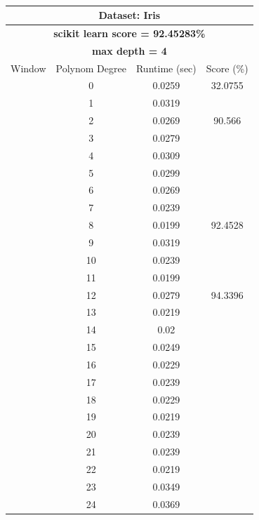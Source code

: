 \documentclass{article}
\begin{document}
\begin{multicols}{2}
\begin{table}[H]
\caption{}
\label{tab:my-table}
\begin{tabular}{|c|c|c|c|}
\hline
\multicolumn{4}{|c|}{\textbf{Dataset: Iris}} \\ \hline
\multicolumn{4}{|c|}{\textbf{scikit learn score = 92.45283\%}} \\ \hline
\multicolumn{4}{|c|}{\textbf{max depth = 4}} \\ \hline
Window & Polynom Degree & Runtime (sec) & Score (\%) \\ \hline
 & 0 & 0.0259 & 32.0755 \\ \cline{2-4} 
 & 1 & 0.0319 &  \\ \cline{2-3}
 & 2 & 0.0269 & \multirow{-2}{*}{90.566} \\ \cline{2-4} 
 & 3 & 0.0279 &  \\ \cline{2-3}
 & 4 & 0.0309 &  \\ \cline{2-3}
 & 5 & 0.0299 &  \\ \cline{2-3}
 & 6 & 0.0269 &  \\ \cline{2-3}
 & 7 & 0.0239 &  \\ \cline{2-3}
 & 8 & 0.0199 & \multirow{-6}{*}{92.4528} \\ \cline{2-4} 
 & \cellcolor[HTML]{FFFFC7}9 & \cellcolor[HTML]{FFFFC7}0.0319 & \cellcolor[HTML]{FFFFC7} \\ \cline{2-3}
 & 10 & 0.0239 & \cellcolor[HTML]{FFFFC7} \\ \cline{2-3}
 & 11 & 0.0199 & \cellcolor[HTML]{FFFFC7} \\ \cline{2-3}
 & 12 & 0.0279 & \multirow{-4}{*}{\cellcolor[HTML]{FFFFC7}94.3396} \\ \cline{2-4} 
 & 13 & 0.0219 &  \\ \cline{2-3}
 & 14 & 0.02 &  \\ \cline{2-3}
 & 15 & 0.0249 &  \\ \cline{2-3}
 & 16 & 0.0229 &  \\ \cline{2-3}
 & 17 & 0.0239 &  \\ \cline{2-3}
 & 18 & 0.0229 &  \\ \cline{2-3}
 & 19 & 0.0219 &  \\ \cline{2-3}
 & 20 & 0.0239 &  \\ \cline{2-3}
 & 21 & 0.0239 &  \\ \cline{2-3}
 & 22 & 0.0219 &  \\ \cline{2-3}
 & 23 & 0.0349 &  \\ \cline{2-3}
 & 24 & 0.0369 &  \\ \cline{2-3}

\end{tabular}
\end{table}
\end{multicols}
\end{document}
